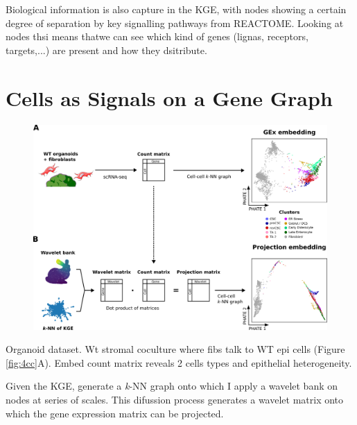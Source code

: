Biological information is also capture in the KGE, with nodes showing a certain degree of separation by key signalling pathways from REACTOME.
    Looking at nodes thsi means thatwe can see which kind of genes (lignas, receptors, targets,...) are present and how they dsitribute. 



\section{Cells as Signals on a Gene Graph}

\begin{figure}
    \centering
    \includegraphics{06kg/figs/6KG_projection.png}
    \caption{}
    \label{fig:6project}
\end{figure}

Organoid dataset. Wt stromal coculture where fibs talk to WT epi cells (Figure \ref{fig:4cc}A). Embed count matrix reveals 2 cells types and epithelial heterogeneity.

Given the KGE, generate a \emph{k}-NN graph onto which I apply a wavelet bank on nodes at series of scales. This difussion process generates a wavelet matrix onto which the gene expression matrix can be projected.

